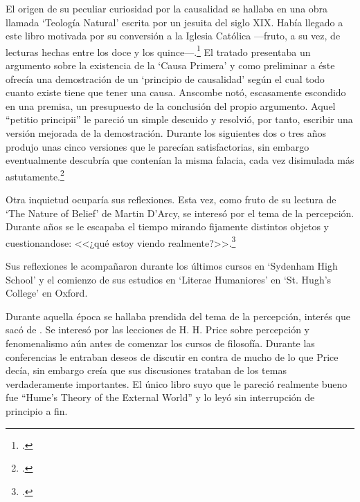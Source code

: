 El origen de su peculiar curiosidad por la causalidad se hallaba en una obra
llamada `Teología Natural' escrita por un jesuita del siglo XIX. Había llegado a
este libro motivada por su conversión a la Iglesia Católica ---fruto, a su vez,
de lecturas hechas entre los doce y los quince---.\footcite[cf.~][p.~vii \S1]{M&PotM}
El tratado presentaba un argumento sobre la existencia de la `Causa Primera' y
como preliminar a éste ofrecía una demostración de un `principio de causalidad'
según el cual todo cuanto existe tiene que tener una causa. Anscombe notó,
escasamente escondido en una premisa, un presupuesto de la conclusión del propio
argumento. Aquel ``petitio principii'' le pareció un simple descuido y resolvió,
por tanto, escribir una versión mejorada de la demostración.
Durante los siguientes dos o tres años produjo unas cinco versiones que le
parecían satisfactorias, sin embargo eventualmente descubría que contenían la
misma falacia, cada vez disimulada más astutamente.\footcite[cf.~][p.~vii
\S2]{M&PotM} 

Otra inquietud ocuparía sus reflexiones. Esta vez, como fruto de su lectura de
`The Nature of Belief' de Martin D'Arcy, se interesó por el tema de la
percepción. Durante años se le escapaba el tiempo mirando fijamente distintos
objetos y cuestionandose: <<¿qué estoy viendo
realmente?>>.\footcite[cf.~][p.~viii \S1]{M&PotM}

Sus reflexiones le acompañaron durante los últimos cursos en `Sydenham High School' y
el comienzo de sus estudios en `Literae Humaniores' en `St. Hugh's College' en
Oxford. 



Durante
aquella época se hallaba prendida del tema de la percepción, interés que sacó de
. Se interesó por las lecciones de H. H. Price
sobre percepción y fenomenalismo aún antes de comenzar los cursos de filosofía.
Durante las conferencias le entraban deseos de discutir en contra de mucho de lo
que Price decía, sin embargo creía que sus discusiones trataban de los temas
verdaderamente importantes. El único libro suyo que le pareció realmente bueno
fue ``Hume's Theory of the External World'' y lo leyó sin interrupción de
principio a fin.




